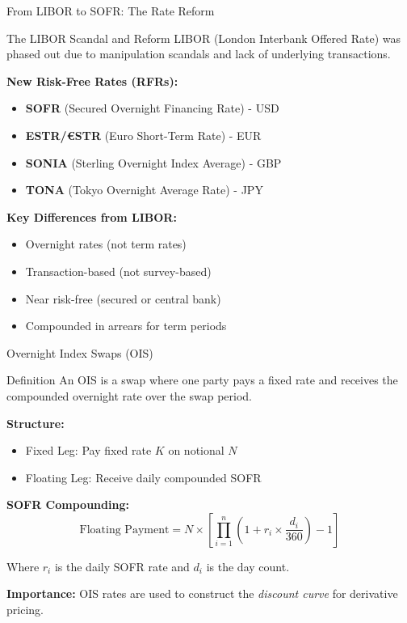\documentclass[aspectratio=169,11pt]{beamer}
\begin{document}
\begin{frame}{From LIBOR to SOFR: The Rate Reform}
\begin{block}{The LIBOR Scandal and Reform}
LIBOR (London Interbank Offered Rate) was phased out due to manipulation scandals and lack of underlying transactions.
\end{block}

\textbf{New Risk-Free Rates (RFRs):}
\begin{itemize}
    \item \textbf{SOFR} (Secured Overnight Financing Rate) - USD
    \item \textbf{ESTR/€STR} (Euro Short-Term Rate) - EUR
    \item \textbf{SONIA} (Sterling Overnight Index Average) - GBP
    \item \textbf{TONA} (Tokyo Overnight Average Rate) - JPY
\end{itemize}

\textbf{Key Differences from LIBOR:}
\begin{itemize}
    \item Overnight rates (not term rates)
    \item Transaction-based (not survey-based)
    \item Near risk-free (secured or central bank)
    \item Compounded in arrears for term periods
\end{itemize}
\end{frame}

\begin{frame}{Overnight Index Swaps (OIS)}
\begin{block}{Definition}
An OIS is a swap where one party pays a fixed rate and receives the compounded overnight rate over the swap period.
\end{block}

\textbf{Structure:}
\begin{itemize}
    \item Fixed Leg: Pay fixed rate $K$ on notional $N$
    \item Floating Leg: Receive daily compounded SOFR
\end{itemize}

\textbf{SOFR Compounding:}
\[
\text{Floating Payment} = N \times \left[ \prod_{i=1}^{n} \left(1 + r_i \times \frac{d_i}{360}\right) - 1 \right]
\]

Where $r_i$ is the daily SOFR rate and $d_i$ is the day count.

\vspace{0.3cm}
\textbf{Importance:} OIS rates are used to construct the \emph{discount curve} for derivative pricing.
\end{frame}
\end{document}
